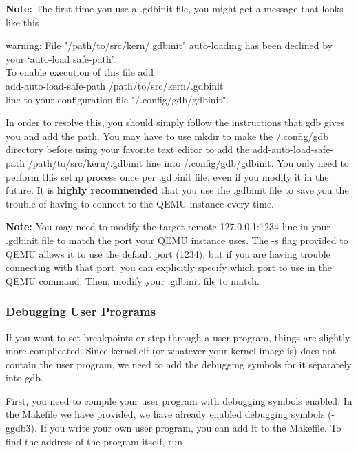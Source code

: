 \documentclass{article}
\begin{document}
	\textbf{Note:} The first time you use a {\fix .gdbinit} file, you might get a message
	that looks like this

	{\fix warning: File "/path/to/src/kern/.gdbinit"
	auto-loading has been declined by\\
	your `auto-load safe-path'.\\
	To enable execution of this file add\\
	add-auto-load-safe-path /path/to/src/kern/.gdbinit\\
	line to your configuration file "\raisebox{0.5ex}{\texttildelow}/.config/gdb/gdbinit".}

	In order to resolve this, you should simply follow the instructions that gdb gives you
	and add the path. You may have to use {\fix mkdir} to make
	the {\fix \raisebox{0.5ex}{\texttildelow}/.config/gdb} directory before using your favorite
	text editor to add the {\fix add-auto-load-safe-path /path/to/src/kern/.gdbinit} line into
	{\fix \raisebox{0.5ex}{\texttildelow}/.config/gdb/gdbinit}. You only need to perform this setup
	process once per {\fix .gdbinit} file, even if you modify it in the future. It is \textbf{highly recommended}
	that you use the {\fix .gdbinit} file to save you the trouble of having to connect to the QEMU instance every time.
	
	\textbf{Note:} You may need to modify the
	{\fix target remote 127.0.0.1:1234} line in your {\fix .gdbinit} file to match
	the port your QEMU instance uses. The {\fix -s} flag provided to QEMU allows it to use
	the default port (1234), but if you are having trouble connecting with that port, you can 
	explicitly specify which port to use in the QEMU command. Then, modify your {\fix .gdbinit} file
	to match.

	\subsubsection{Debugging User Programs}

	If you want to set breakpoints or step through a user program, things are
	slightly more complicated. Since {\fix kernel.elf} (or whatever your kernel
	image is) does not contain the user program, we need to add the debugging
	symbols for it separately into gdb.

	First, you need to compile your user program with debugging symbols enabled.
	In the {\fix Makefile} we have provided, we have already enabled debugging symbols
	({\fix -ggdb3}). If you write your own user program, you can
	add it to the {\fix Makefile}. To find the address of the program itself, run
\end{document}
